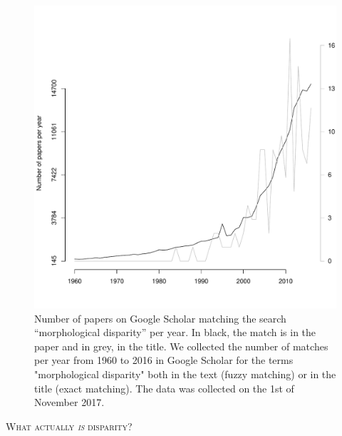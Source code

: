 \documentclass[12pt,letterpaper]{article}
\renewcommand{\section}[1]{%
\bigskip
\begin{center}
\begin{Large}
\normalfont\scshape #1
\medskip
\end{Large}
\end{center}}
\begin{document}
\begin{figure}[!htbp]
\centering
   \includegraphics[width=1\textwidth]{Figures/GoogleScholarOccurences.pdf} 
\caption{Number of papers on Google Scholar matching the search ``morphological disparity'' per year. In black, the match is in the paper and in grey, in the title. We collected the number of matches per year from 1960 to 2016 in Google Scholar for the terms "morphological disparity" both in the text (fuzzy matching) or in the title (exact matching). The data was collected on the 1st of November 2017.}
\label{Fig:GoogleOccurences}
\end{figure}


\section{What actually \textit{is} disparity?}
\end{document}
